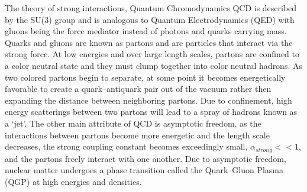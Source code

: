 \par
The theory of strong interactions, Quantum Chromodynamics QCD is described by the SU(3) group and is analogous to Quantum Electrodynamics (QED) with gluons being the force mediator instead of photons and quarks carrying mass.  Quarks and gluons are known as partons and are particles that interact via the strong force.  At low energies and over large length scales, partons are confined to a color neutral state and they must clump together into color neutral hadrons.  As two colored partons begin to separate, at some point it becomes energetically favorable to create a quark--antiquark pair out of the vacuum rather then expanding the distance between neighboring partons.  Due to confinement, high energy scatterings between two partons will lead to a spray of hadrons known as a `jet'.  The other main attribute of QCD is asymptotic freedom, as the interactions between partons become more energetic and the length scale decreases, the strong coupling constant becomes exceedingly small, $ \alpha_{strong} << 1$, and the partons freely interact with one another.  Due to asymptotic freedom, nuclear matter undergoes a phase transition called the Quark--Gluon Plasma (QGP) at high energies and densities. 






